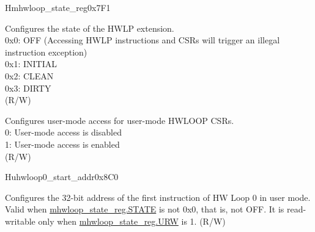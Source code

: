 \begin{register}{H}{mhwloop\_state\_reg}{0x7F1}\label{regdesc:mhwlp_state_reg}
%
%
%
\regnewline%
\begin{regdesc}\begin{reglist}
\label{fielddesc:HWSTATE}\item [STATE] Configures the state of the HWLP extension.\\
0x0: OFF (Accessing HWLP instructions and CSRs will trigger an illegal instruction exception)\\
0x1: INITIAL\\
0x2: CLEAN\\
0x3: DIRTY\\
(R/W)
\label{fielddesc:URW}\item [URW] Configures user-mode access for user-mode HWLOOP CSRs. \\
0: User-mode access is disabled\\
1: User-mode access is enabled \\
(R/W)
\end{reglist}\end{regdesc}
\end{register} 

\begin{register}{H}{uhwloop0\_start\_addr}{0x8C0}\label{regdesc:uhloop0_start_addr}
%
\regnewline%
\begin{regdesc}\begin{reglist}
\label{fielddesc:UHWLP0_SA}\item [SA] Configures the 32-bit address of the first instruction of HW Loop 0 in user mode. Valid when \hyperref[fielddesc:HWSTATE]{mhwloop\_state\_reg.STATE} is not 0x0, that is, not OFF. It is read-writable only when \hyperref[fielddesc:HWSTATE]{mhwloop\_state\_reg.URW} is 1. (R/W)
\end{reglist}\end{regdesc}
\end{register}


